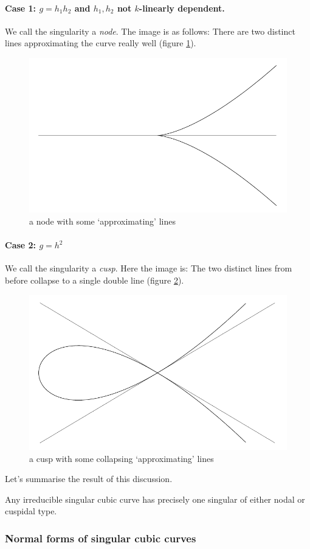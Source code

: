 \paragraph{Case 1: $g=h_1h_2$ and $h_1,h_2$ not $k$-linearly dependent.}
We call the singularity a \emph{node}.
The image is as follows: There are two distinct lines approximating the curve really well (figure \ref{figureNode}).
\begin{figure}
\center
\includegraphics[width=.5\textwidth]{img/nodal.pdf}
\caption{a node with some `approximating' lines}
\label{figureNode}
\end{figure}



\paragraph{Case 2: $g=h^2$}
We call the singularity a \emph{cusp}.
Here the image is: The two distinct lines from before collapse to a single double line (figure \ref{figureCusp}).
\begin{figure}
\center
\includegraphics[width=.5\textwidth]{img/cuspidal.pdf}
\caption{a cusp with some collapsing `approximating' lines}
\label{figureCusp}
\end{figure}


Let's summarise the result of this discussion.

\begin{proposition} \label{propositionClassificationOfSingularCubics}
Any irreducible singular cubic curve has precisely one singular of either nodal or cuspidal type.
\end{proposition}


\subsubsection{Normal forms of singular cubic curves}

